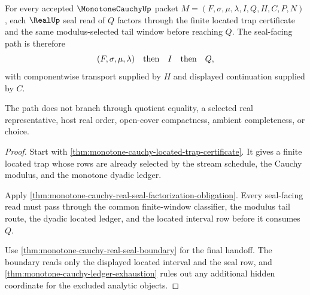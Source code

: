 \begin{theorem}
\label{thm:monotone-cauchy-tail-window-real-seal-certificate}
For every accepted $\MonotoneCauchyUp$ packet $M=(F,\sigma,\mu,\lambda,I,Q,H,C,P,N)$, each $\RealUp$ seal read of $Q$ factors through the finite located trap certificate and the same modulus-selected tail window before reaching $Q$. The seal-facing path is therefore
$$
(F,\sigma,\mu,\lambda)
\quad\hbox{then}\quad
I
\quad\hbox{then}\quad
Q,
$$
with componentwise transport supplied by $H$ and displayed continuation supplied by $C$.

The path does not branch through quotient equality, a selected real representative, host real order, open-cover compactness, ambient completeness, or choice.
\end{theorem}
\begin{proof}
Start with \autoref{thm:monotone-cauchy-located-trap-certificate}. It gives a finite located trap whose rows are already selected by the stream schedule, the Cauchy modulus, and the monotone dyadic ledger.

Apply \autoref{thm:monotone-cauchy-real-seal-factorization-obligation}. Every seal-facing read must pass through the common finite-window classifier, the modulus tail route, the dyadic located ledger, and the located interval row before it consumes $Q$.

Use \autoref{thm:monotone-cauchy-real-seal-boundary} for the final handoff. The boundary reads only the displayed located interval and the seal row, and \autoref{thm:monotone-cauchy-ledger-exhaustion} rules out any additional hidden coordinate for the excluded analytic objects.
\end{proof}


